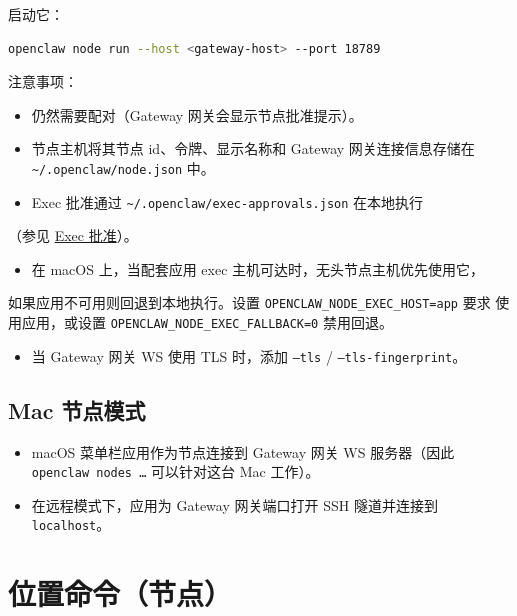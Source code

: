 启动它：

\begin{lstlisting}[language=bash]
openclaw node run --host <gateway-host> --port 18789
\end{lstlisting}


注意事项：

\begin{itemize}
  \item 仍然需要配对（Gateway 网关会显示节点批准提示）。
  \item 节点主机将其节点 id、令牌、显示名称和 Gateway 网关连接信息存储在 \texttt{\textasciitilde{}/.openclaw/node.json} 中。
  \item Exec 批准通过 \texttt{\textasciitilde{}/.openclaw/exec-approvals.json} 在本地执行
\end{itemize}

（参见 \href{/tools/exec-approvals}{Exec 批准}）。
\begin{itemize}
  \item 在 macOS 上，当配套应用 exec 主机可达时，无头节点主机优先使用它，
\end{itemize}

如果应用不可用则回退到本地执行。设置 \texttt{OPENCLAW\_NODE\_EXEC\_HOST=app} 要求
使用应用，或设置 \texttt{OPENCLAW\_NODE\_EXEC\_FALLBACK=0} 禁用回退。
\begin{itemize}
  \item 当 Gateway 网关 WS 使用 TLS 时，添加 \texttt{--tls} / \texttt{--tls-fingerprint}。
\end{itemize}


\subsection{Mac 节点模式}


\begin{itemize}
  \item macOS 菜单栏应用作为节点连接到 Gateway 网关 WS 服务器（因此 \texttt{openclaw nodes …} 可以针对这台 Mac 工作）。
  \item 在远程模式下，应用为 Gateway 网关端口打开 SSH 隧道并连接到 \texttt{localhost}。
\end{itemize}



\clearpage

\section{位置命令（节点）}


